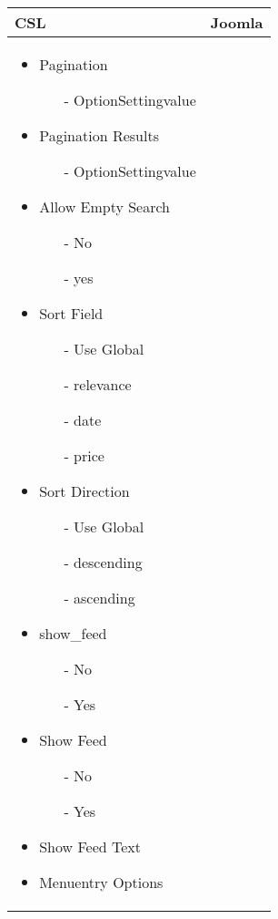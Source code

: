 \begin{minipage}{0.7\textwidth}
\begin{tabular}{|p{} | p{}|}
\hline
\textbf{CSL} & \textbf{Joomla} \\ 
\hline
\begin{itemize}
\item Pagination
\begin{enumerate}
 	\item[-] OptionSettingvalue
 \end{enumerate}
\item Pagination Results
\begin{enumerate}
 	\item[-] OptionSettingvalue
 \end{enumerate} 
\item Allow Empty Search
\begin{enumerate}
 	\item[-] No
 	\item[-] yes 
 \end{enumerate} 
\item Sort Field
\begin{enumerate}
 	\item[-] Use Global
 	\item[-] relevance
 	\item[-] date
 	\item[-] price
 \end{enumerate} 
\item Sort Direction
\begin{enumerate}
 	\item[-] Use Global
 	\item[-] descending
 	\item[-] ascending
 \end{enumerate} 
\item show\_feed
\begin{enumerate}
 	\item[-] No
 	\item[-] Yes
 \end{enumerate} 
\item Show Feed
\begin{enumerate}
 	\item[-] No
 	\item[-] Yes
 \end{enumerate} 
\item Show Feed Text 
\item Menuentry Options
\end{itemize}

\end{tabular}
\end{minipage}
